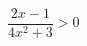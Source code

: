 \begin{ex}[type=inequality]
	\begin{condition}
		\( \dfrac{2x-1}{4x^2+3}>0 \)
	\end{condition}
\end{ex}